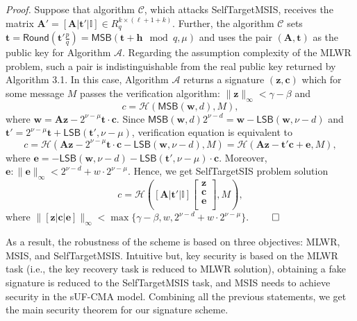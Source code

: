 \documentclass{article}
\theoremstyle{plain}
\theoremstyle{definition}
\begin{document}
    \emph{Proof.} Suppose that algorithm $\mathcal{C}$, which attacks SelfTargetMSIS, receives the matrix $\mathbf{A}' = [\mathbf{A} | \mathbf{t'} | \mathbb{I}] \in R^{k \times (\ell + 1 + k)}_{q}$. Further, the algorithm $\mathcal{C}$ sets $\mathbf{t} = \mathsf{Round}\left(\mathbf{t'}\frac{p}{q}\right) = \mathsf{MSB}(\mathbf{t} + \mathbf{h} \mod q, \mu)$ and uses the pair $(\mathbf{A}, \mathbf{t})$ as the public key for Algorithm $\mathcal{A}$. Regarding the assumption complexity of the MLWR problem, such a pair is indistinguishable from the real public key returned by Algorithm 3.1. In this case, Algorithm $\mathcal{A}$ returns a signature $(\mathbf{z}, \mathbf{c})$ which for some message $M$ passes the verification algorithm: $\|\mathbf{z}\|_\infty < \gamma - \beta$ and
    $$
    c = \mathcal{H}(\mathsf{MSB}(\mathbf{w}, d), M),
    $$
    where $\mathbf{w} = \mathbf{Az} - 2^{\nu - \mu}\mathbf{t} \cdot \mathbf{c}$. Since $\mathsf{MSB}(\mathbf{w}, d) 2^{\nu - d} = \mathbf{w} - \mathsf{LSB}(\mathbf{w}, \nu - d)$ and $\mathbf{t'} = 2^{\nu - \mu} \mathbf{t} + \mathsf{LSB}(\mathbf{t}', \nu - \mu)$, verification equation is equivalent to
    $$
    c = \mathcal{H}(\mathbf{Az} - 2^{\nu - \mu}\mathbf{t} \cdot \mathbf{c} - \mathsf{LSB}(\mathbf{w}, \nu - d), M) = \mathcal{H}(\mathbf{Az} - \mathbf{t'c} + \mathbf{e}, M),
    $$
    where $\mathbf{e} = -\mathsf{LSB}(\mathbf{w}, \nu - d) - \mathsf{LSB}(\mathbf{t}', \nu - \mu) \cdot \mathbf{c}$. Moreover, $\mathbf{e}: \|\mathbf{e}\|_{\infty} < 2^{\nu-d} + w\cdot2^{\nu - \mu}$. Hence, we get SelfTargetSIS problem solution
    $$
    c = \mathcal{H} \left( [\mathbf{A}|\mathbf{t'}|\mathbb{I}] 
        \begin{bmatrix}
            \mathbf{z}\\
            \mathbf{c}\\
            \mathbf{e}\\
        \end{bmatrix},
        M
        \right),
    $$
    where $\|[\mathbf{z}|\mathbf{c}|\mathbf{e}]\|_{\infty} < \max\{\gamma - \beta, w, 2^{\nu - d} + w \cdot 2^{\nu - \mu}\}$. $\qed$

    As a result, the robustness of the scheme is based on three objectives: MLWR, MSIS, and SelfTargetMSIS. Intuitive but, key security is based on the MLWR task (i.e., the key recovery task is reduced to MLWR solution), obtaining a fake signature is reduced to the SelfTargetMSIS task, and MSIS needs to achieve security in the sUF-CMA model. Combining all the previous statements, we get the main security theorem for our signature scheme.
\end{document}
